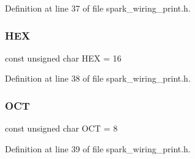 Definition at line 37 of file spark\+\_\+wiring\+\_\+print.\+h.

\mbox{\label{test_2gcclib_2spark__wiring__print_8h_a777726851dda95dabcc50f606e2dfd8e}} 
\subsubsection{H\+EX}
{\footnotesize\ttfamily const unsigned char H\+EX = 16}



Definition at line 38 of file spark\+\_\+wiring\+\_\+print.\+h.

\mbox{\label{test_2gcclib_2spark__wiring__print_8h_aeea5c9efade0b29d08f3b5b8336425ad}} 
\subsubsection{O\+CT}
{\footnotesize\ttfamily const unsigned char O\+CT = 8}



Definition at line 39 of file spark\+\_\+wiring\+\_\+print.\+h.

